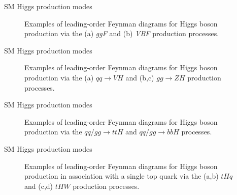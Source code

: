 \documentclass[10pt,UKenglish, leqno, xcolor = dvipsnames]{beamer}
\begin{document}
		\begin{frame}{SM Higgs production modes}
			\vfill
			\centering
			\begin{figure}
				\centering
				\caption{Examples of leading-order Feynman diagrams for Higgs boson production via the (a) \textit{ggF} and (b) \textit{VBF} production processes.}
			\end{figure}
			\vfill
		\end{frame}

		\begin{frame}{SM Higgs production modes}
			\vfill
			\begin{figure}
				\centering
				\hspace{.2cm}
				\hspace{.2cm}				
				\caption{Examples of leading-order Feynman diagrams for Higgs boson production via the (a) $qq\to VH$ and (b,c) $gg\to ZH$ production processes.}
			\end{figure}
			\vfill
		\end{frame}
	
		\begin{frame}{SM Higgs production modes}
			\vfill
			\centering
			\begin{figure}
				\centering
				\hspace{.2cm}
				\hspace{.2cm}				
				\caption{Examples of leading-order Feynman diagrams for Higgs boson production via the $qq/gg\to ttH$ and $qq/gg\to bbH$ processes.}
			\end{figure}
			\vfill
		\end{frame}

		\begin{frame}{SM Higgs production modes}
			\vfill
			\begin{figure}
				\centering
				\hspace{.1cm}
				\hspace{.1cm}				
				\hspace{.1cm}
				\caption{Examples of leading-order Feynman diagrams for Higgs boson production in association with a single top quark via the (a,b) $tHq$ and (c,d) $tHW$ production processes.}
			\end{figure}
			\vfill
		\end{frame}
\end{document}
